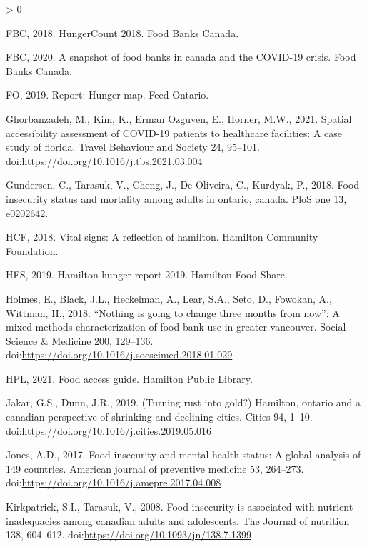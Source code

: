 \documentclass[]{elsarticle} %
\newlength{\cslhangindent}
\newenvironment{CSLReferences}[2] %
 {%
  \setlength{\parindent}{0pt}
  \ifodd #1 \everypar{\setlength{\hangindent}{\cslhangindent}}\ignorespaces\fi
  \ifnum #2 > 0
  \setlength{\parskip}{#2\baselineskip}
  \fi
 }%
 {}
\begin{document}
\begin{CSLReferences}{1}{0}
\leavevmode\hypertarget{ref-fbc2018}{}%
FBC, 2018. HungerCount 2018. Food Banks Canada.

\leavevmode\hypertarget{ref-fbc2020}{}%
FBC, 2020. A snapshot of food banks in canada and the COVID-19 crisis.
Food Banks Canada.

\leavevmode\hypertarget{ref-feedontario2019}{}%
FO, 2019. Report: Hunger map. Feed Ontario.

\leavevmode\hypertarget{ref-ghorbanzadeh2021spatial}{}%
Ghorbanzadeh, M., Kim, K., Erman Ozguven, E., Horner, M.W., 2021.
Spatial accessibility assessment of COVID-19 patients to healthcare
facilities: A case study of florida. Travel Behaviour and Society 24,
95--101. doi:\url{https://doi.org/10.1016/j.tbs.2021.03.004}

\leavevmode\hypertarget{ref-gundersen2018food}{}%
Gundersen, C., Tarasuk, V., Cheng, J., De Oliveira, C., Kurdyak, P.,
2018. Food insecurity status and mortality among adults in ontario,
canada. PloS one 13, e0202642.

\leavevmode\hypertarget{ref-hcf2018}{}%
HCF, 2018. Vital signs: A reflection of hamilton. Hamilton Community
Foundation.

\leavevmode\hypertarget{ref-hfs2019}{}%
HFS, 2019. Hamilton hunger report 2019. Hamilton Food Share.

\leavevmode\hypertarget{ref-holmes2018nothing}{}%
Holmes, E., Black, J.L., Heckelman, A., Lear, S.A., Seto, D., Fowokan,
A., Wittman, H., 2018. {``Nothing is going to change three months from
now''}: A mixed methods characterization of food bank use in greater
vancouver. Social Science \& Medicine 200, 129--136.
doi:\url{https://doi.org/10.1016/j.socscimed.2018.01.029}

\leavevmode\hypertarget{ref-hpl2021}{}%
HPL, 2021. Food access guide. Hamilton Public Library.

\leavevmode\hypertarget{ref-jakar2019turning}{}%
Jakar, G.S., Dunn, J.R., 2019. (Turning rust into gold?) Hamilton,
ontario and a canadian perspective of shrinking and declining cities.
Cities 94, 1--10. doi:\url{https://doi.org/10.1016/j.cities.2019.05.016}

\leavevmode\hypertarget{ref-jones2017food}{}%
Jones, A.D., 2017. Food insecurity and mental health status: A global
analysis of 149 countries. American journal of preventive medicine 53,
264--273. doi:\url{https://doi.org/10.1016/j.amepre.2017.04.008}

\leavevmode\hypertarget{ref-kirkpatrick2008food}{}%
Kirkpatrick, S.I., Tarasuk, V., 2008. Food insecurity is associated with
nutrient inadequacies among canadian adults and adolescents. The Journal
of nutrition 138, 604--612.
doi:\url{https://doi.org/10.1093/jn/138.7.1399}


\end{CSLReferences}
\end{document}
